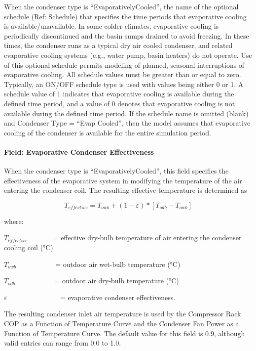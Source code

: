 When the condenser type is ``EvaporativelyCooled'', the name of the optional schedule (Ref: Schedule) that specifies the time periods that evaporative cooling is available/unavailable. In some colder climates, evaporative cooling is periodically discontinued and the basin sumps drained to avoid freezing. In these times, the condenser runs as a typical dry air cooled condenser, and related evaporative cooling systems (e.g., water pump, basin heaters) do not operate. Use of this optional schedule permits modeling of planned, seasonal interruptions of evaporative cooling. All schedule values must be greater than or equal to zero. Typically, an ON/OFF schedule type is used with values being either 0 or 1. A schedule value of 1 indicates that evaporative cooling is available during the defined time period, and a value of 0 denotes that evaporative cooling is not available during the defined time period. If the schedule name is omitted (blank) and Condenser Type = ``Evap Cooled'', then the model assumes that evaporative cooling of the condenser is available for the entire simulation period.

\paragraph{Field: Evaporative Condenser Effectiveness}\label{field-evaporative-condenser-effectiveness-001}

When the condenser type is ``EvaporativelyCooled'', this field specifies the effectiveness of the evaporative system in modifying the temperature of the air entering the condenser coil. The resulting effective temperature is determined as

\begin{equation}
{T_{effective}} = {T_{owb}} + (1 - \varepsilon )*[{T_{odb}} - {T_{owb}}]
\end{equation}

where:

\({T_{effective}}\) ~~~~~~ = effective dry-bulb temperature of air entering the condenser cooling coil (°C)

\({T_{owb}}\) ~~~~~~~~~~ = outdoor air wet-bulb temperature (°C)

\({T_{odb}}\) ~~~~~~~~~~ = outdoor air dry-bulb temperature (°C)

\(\varepsilon\) ~~~~~~~~~~~~~~ = evaporative condenser effectiveness.

The resulting condenser inlet air temperature is used by the Compressor Rack COP as a Function of Temperature Curve and the Condenser Fan Power as a Function of Temperature Curve. The default value for this field is 0.9, although valid entries can range from 0.0 to 1.0.


